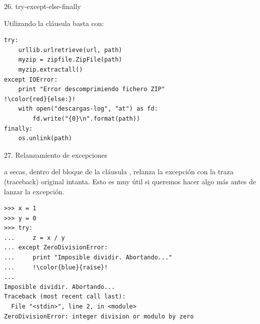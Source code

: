 \documentclass[14pt]{beamer}
\begin{document}
\begin{frame}[fragile]{26. try-except-else-finally}
  \begin{block}{}
    \centering
    Utilizando la cláusula  basta con:
  \end{block}

  \begin{exampleblock}{}
    \footnotesize
    \begin{lstlisting}[escapechar=!]
try:
    urllib.urlretrieve(url, path)
    myzip = zipfile.ZipFile(path)
    myzip.extractall()
except IOError:
    print "Error descomprimiendo fichero ZIP"
!\color{red}{else:}!
    with open("descargas-log", "at") as fd:
        fd.write("{0}\n".format(path))
finally:
    os.unlink(path)
    \end{lstlisting}
  \end{exampleblock}
\end{frame}

\begin{frame}[fragile]{27. Relanzamiento de excepciones}
  \small
  \begin{block}{}
    \centering
     a secas, dentro del bloque de la cláusula
    , relanza la excepción con la traza (traceback)
    original intanta. Esto es muy útil si queremos hacer algo más
    antes de lanzar la excepción.
  \end{block}

  \begin{exampleblock}{}
    \scriptsize
    \begin{lstlisting}[escapechar=!]
>>> x = 1
>>> y = 0
>>> try:
...     z = x / y
... except ZeroDivisionError:
...     print "Imposible dividir. Abortando..."
...     !\color{blue}{raise}!
...
Imposible dividir. Abortando...
Traceback (most recent call last):
  File "<stdin>", line 2, in <module>
ZeroDivisionError: integer division or modulo by zero
    \end{lstlisting}
  \end{exampleblock}
\end{frame}
\end{document}
